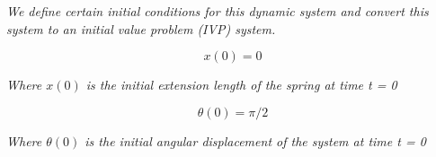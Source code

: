 \textit{We define certain initial conditions for this dynamic system and convert this system to an initial value problem (IVP) system.}
        
    $$x(0) = 0$$
        
    \textit{Where $x(0)$ is the initial extension length of the spring at time t = 0}
        
    $$\theta(0) = \pi/2$$
        
    \textit{Where $\theta(0)$ is the initial angular displacement of the system at time t = 0}
        
        

